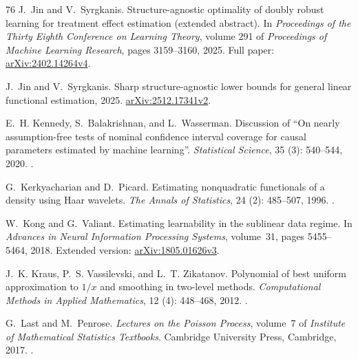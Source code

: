 \documentclass[12pt,oneside,openany]{book}
\numberwithin{equation}{chapter}
\theoremstyle{plain}
\theoremstyle{definition}
\theoremstyle{remark}
\begin{document}
\begin{thebibliography}{76}
J.~Jin and V.~Syrgkanis.
\newblock Structure-agnostic optimality of doubly robust learning for treatment
  effect estimation (extended abstract).
\newblock In \emph{Proceedings of the Thirty Eighth Conference on Learning
  Theory}, volume 291 of \emph{Proceedings of Machine Learning Research}, pages
  3159--3160, 2025{}.
\newblock Full paper:
  \href{https://arxiv.org/abs/2402.14264v4}{arXiv:2402.14264v4}.

J.~Jin and V.~Syrgkanis.
\newblock Sharp structure-agnostic lower bounds for general linear functional
  estimation, 2025{}.
\newblock \href{https://arxiv.org/abs/2512.17341v2}{arXiv:2512.17341v2}.

E.~H. Kennedy, S.~Balakrishnan, and L.~Wasserman.
\newblock Discussion of ``{On} nearly assumption-free tests of nominal
  confidence interval coverage for causal parameters estimated by machine
  learning''.
\newblock \emph{Statistical Science}, 35 (3): 540--544, 2020.
\newblock {}.

G.~Kerkyacharian and D.~Picard.
\newblock Estimating nonquadratic functionals of a density using {Haar}
  wavelets.
\newblock \emph{The Annals of Statistics}, 24 (2): 485--507,
  1996.
\newblock {}.

W.~Kong and G.~Valiant.
\newblock Estimating learnability in the sublinear data regime.
\newblock In \emph{Advances in Neural Information Processing Systems},
  volume~31, pages 5455--5464, 2018.
\newblock Extended version:
  \href{https://arxiv.org/abs/1805.01626v3}{arXiv:1805.01626v3}.

J.~K. Kraus, P.~S. Vassilevski, and L.~T. Zikatanov.
\newblock Polynomial of best uniform approximation to {$1/x$} and smoothing in
  two-level methods.
\newblock \emph{Computational Methods in Applied Mathematics}, 12
  (4): 448--468, 2012.
\newblock {}.

G.~Last and M.~Penrose.
\newblock \emph{Lectures on the {Poisson} Process}, volume~7 of \emph{Institute
  of Mathematical Statistics Textbooks}.
\newblock Cambridge University Press, Cambridge, 2017.
\newblock {}.


\end{thebibliography}
\end{document}
